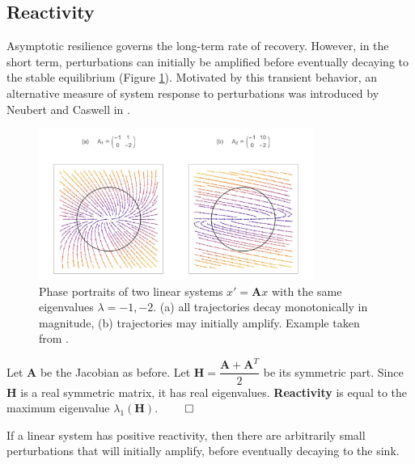\subsection{Reactivity}
Asymptotic resilience governs the long-term rate of recovery. However, in the short term, perturbations can initially be amplified before eventually decaying to the stable equilibrium (Figure \ref{fig:reactivity}). Motivated by this transient behavior, an alternative measure of system response to perturbations was introduced by Neubert and Caswell in \cite{neubertAlternativesResilienceMeasuring1997a}.

\begin{figure}[ht]
	\label{fig:reactivity}
	\centering
	\includegraphics[width=0.8\textwidth]{figs/positive_reactivity_real_example}
	\caption{Phase portraits of two linear systems $x' = \textbf{A}x$ with the same eigenvalues  $\lambda = -1, -2$. (a) all trajectories decay monotonically in magnitude, (b) trajectories may initially amplify. Example taken from \cite{neubertAlternativesResilienceMeasuring1997a}.}
\end{figure} 

\begin{definition}
	Let $\textbf{A}$ be the Jacobian as before. Let $\textbf{H} = \dfrac{\textbf{A}+\textbf{A}^T}{2}$ be its symmetric part. Since $\textbf{H}$ is a real symmetric matrix, it has real eigenvalues. \textbf{Reactivity} is equal to the maximum eigenvalue $\lambda_1(\textbf{H})$.  
	\(\qed\)
\end{definition}

If a linear system has positive reactivity, then there are arbitrarily small perturbations that will initially amplify, before eventually decaying to the sink. 